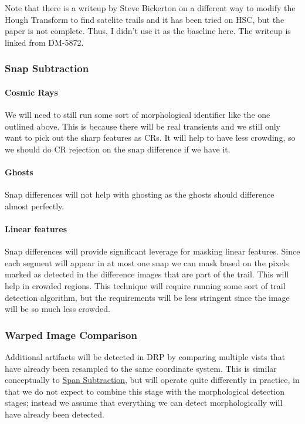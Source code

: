 \begin{note}
Note that there is a writeup by Steve Bickerton on a different way to modify the Hough Transform to find satelite trails and it has been tried on HSC, but the paper is not complete.  Thus, I didn't use it as the baseline here.  The writeup is linked from DM-5872.
\end{note}

\subsubsection{Snap Subtraction}
\label{sec:acSnapSubtraction}
\paragraph{Cosmic Rays}
We will need to still run some sort of morphological identifier like the one outlined above.  This is because there will be real transients and we still only want to pick out the sharp features as CRs.  It will help to have less crowding, so we should do CR rejection on the snap difference if we have it.

\paragraph{Ghosts}
Snap differences will not help with ghosting as the ghosts should difference almost perfectly.

\paragraph{Linear features}
Snap differences will provide significant leverage for masking linear features.  Since each segment will appear in at most one snap we can mask based on the pixels marked as detected in the difference images that are part of the trail.  This will help in crowded regions.  This technique will require running some sort of trail detection algorithm, but the requirements will be less stringent since the image will be so much less crowded.

\subsubsection{Warped Image Comparison}
\label{sec:acWarpedImageArtifactDetection}

Additional artifacts will be detected in DRP by comparing multiple vists that have already been resampled to the same coordinate system.  This is similar conceptually to \hyperref[sec:acSnapSubtraction]{Span Subtraction}, but will operate quite differently in practice, in that we do not expect to combine this stage with the morphological detection stages; instead we assume that everything we can detect morphologically will have already been detected.

